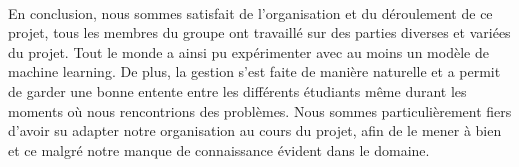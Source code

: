 \paragraph{} En conclusion, nous sommes satisfait de l'organisation et du déroulement de ce projet, tous les membres du groupe ont travaillé sur des parties diverses et variées du projet. Tout le monde a ainsi pu expérimenter avec au moins un modèle de machine learning. De plus, la gestion s'est faite de manière naturelle et a permit de garder une bonne entente entre les différents étudiants même durant les moments où nous rencontrions des problèmes. Nous sommes particulièrement fiers d'avoir su adapter notre organisation au cours du projet, afin de le mener à bien et ce malgré notre manque de connaissance évident dans le domaine.